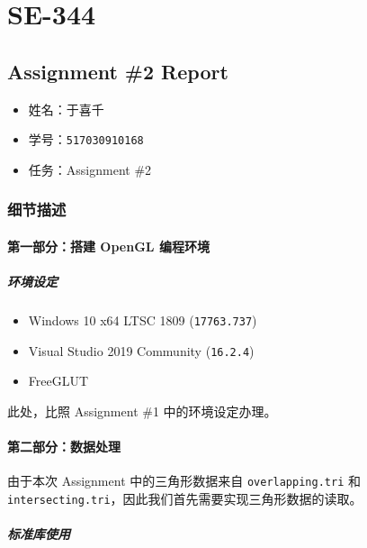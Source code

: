 \documentclass[
]{article}
\date{}
\begin{document}
\hypertarget{header-n0}{%
\section{SE-344}\label{header-n0}}

\hypertarget{header-n2}{%
\subsection{Assignment \#2 Report}\label{header-n2}}

\begin{itemize}
\item
  姓名：于喜千
\item
  学号：\texttt{517030910168}
\item
  任务：Assignment \#2
\end{itemize}

\hypertarget{header-n10}{%
\subsubsection{细节描述}\label{header-n10}}

\hypertarget{header-n11}{%
\paragraph{第一部分：搭建 OpenGL 编程环境}\label{header-n11}}

\hypertarget{header-n12}{%
\subparagraph{环境设定}\label{header-n12}}

\begin{itemize}
\item
  Windows 10 x64 LTSC 1809 (\texttt{17763.737})
\item
  Visual Studio 2019 Community (\texttt{16.2.4})
\item
  FreeGLUT
\end{itemize}

此处，比照 Assignment \#1 中的环境设定办理。

\hypertarget{header-n21}{%
\paragraph{第二部分：数据处理}\label{header-n21}}

由于本次 Assignment 中的三角形数据来自 \texttt{overlapping.tri} 和
\texttt{intersecting.tri}，因此我们首先需要实现三角形数据的读取。

\hypertarget{header-n23}{%
\subparagraph{标准库使用}\label{header-n23}}
\end{document}
